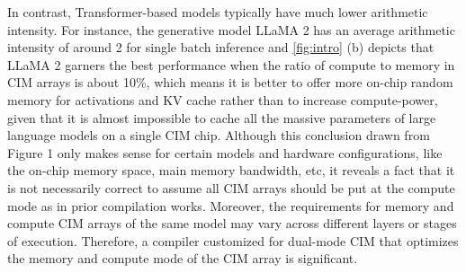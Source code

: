  In contrast, Transformer-based models typically have much lower arithmetic intensity. For instance, the generative model LLaMA 2 has an average arithmetic intensity of around 2 for single batch inference and \fig\ref{fig:intro} (b) depicts that LLaMA 2 garners the best performance when the ratio of compute to memory in CIM arrays is about 10\%, which means it is better to offer more on-chip random memory for activations and KV cache rather than to increase compute-power, given that it is almost impossible to cache all the massive parameters of large language models on a single CIM chip. Although this conclusion drawn from Figure 1 only makes sense for certain models and hardware configurations, like the on-chip memory space, main memory bandwidth, etc, it reveals a fact that it is not necessarily correct to assume all CIM arrays should be put at the compute mode as in prior compilation works.
 Moreover, the requirements for memory and compute CIM arrays of the same model may vary across different layers or stages of execution. 
 Therefore, a compiler customized for dual-mode CIM that optimizes the memory and compute mode of the CIM array is significant.
 
